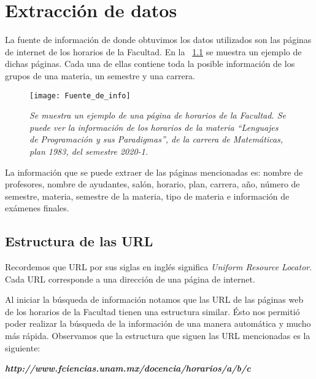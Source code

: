\chapter{Extracción de datos}

La fuente de información de donde obtuvimos los datos utilizados son las páginas de internet de los horarios de la Facultad. En la \figurename{~\ref{pagFC}} se muestra un ejemplo de dichas páginas. Cada una de ellas contiene toda la posible información de los grupos de una materia, un semestre y una carrera. %

\begin{figure}[H]
\centering
\texttt{[image: Fuente\_de\_info]} %
\caption[\textit{Página de horarios de la Facultad}]{\textit{Se muestra un ejemplo de una página de horarios de la Facultad. Se puede ver la información de los horarios de la materia ``Lenguajes de Programación y sus Paradigmas'', de la carrera de Matemáticas, plan 1983, del semestre 2020-1.}}\label{pagFC}
\end{figure}

La información que se puede extraer de las páginas mencionadas es: nombre de profesores, nombre de ayudantes, salón, horario, plan, carrera, año, número de semestre, materia, semestre de la materia, tipo de materia e información de exámenes finales.


\section{Estructura de las URL} \label{Sec_ED_estructura_URL}

Recordemos que URL por sus siglas en inglés significa \textit{Uniform Resource Locator}. Cada URL corresponde a una dirección de una página de internet. %

Al iniciar la búsqueda de información notamos que las URL de las páginas web de los horarios de la Facultad tienen una estructura similar. Ésto nos permitió poder realizar la búsqueda de la información de una manera automática y mucho más rápida. Observamos que la estructura que siguen las URL mencionadas es la siguiente:
  
  \begin{center}
\textit{\textbf{http://www.fciencias.unam.mx/docencia/horarios/a/b/c}}
\end{center}

